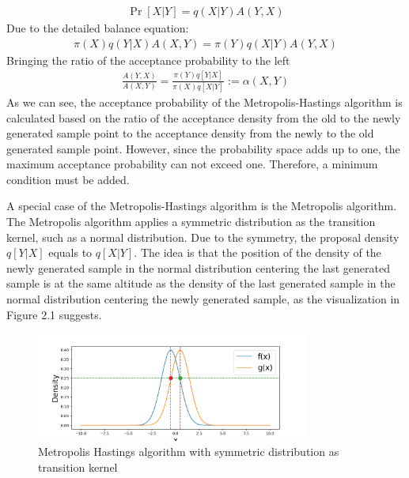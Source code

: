 \begin{align}
\Pr[X|Y] = q(X|Y) A(Y, X)
\end{align}
Due to the detailed balance equation:\cite{mcmc_practice}
\begin{align}
\pi(X) q(Y|X) A(X, Y) = \pi(Y) q(X|Y) A(Y, X)
\end{align}
Bringing the ratio of the acceptance probability to the left
\begin{align}
\frac{A(Y, X)}{A(X, Y)} = \frac{\pi(Y)q[Y|X]}{\pi(X)q[X|Y]} := \alpha(X, Y)
\end{align} 
As we can see, the acceptance probability of the Metropolis-Hastings algorithm is calculated based on the ratio of the acceptance density from the old to the newly generated sample point to the acceptance density from the newly to the old generated sample point. However, since the probability space adds up to one, the maximum acceptance probability can not exceed one. Therefore, a minimum condition must be added.

A special case of the Metropolis-Hastings algorithm is the Metropolis algorithm. The Metropolis algorithm applies a symmetric distribution as the transition kernel, such as a normal distribution.\cite{metropolis} Due to the symmetry, the proposal density $q[Y|X]$ equals to $q[X|Y]$. The idea is that the position of the density of the newly generated sample in the normal distribution centering the last generated sample is at the same altitude as the density of the last generated sample in the normal distribution centering the newly generated sample, as the visualization in Figure 2.1 suggests. 
\begin{figure}[H]
    \centering
    \includegraphics[width=0.8\textwidth]{figures/mcmc_example/proof.png}
    \captionsetup{width=.8\textwidth}
    \caption{Metropolis Hastings algorithm with symmetric distribution as transition kernel}
    \label{fig:enter-label}
\end{figure}

